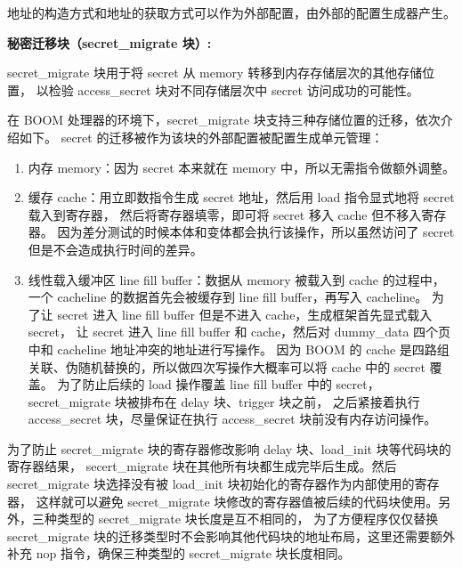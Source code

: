 地址的构造方式和地址的获取方式可以作为外部配置，由外部的配置生成器产生。\par

\textbf{秘密迁移块（secret\_migrate 块）:}\par
secret\_migrate 块用于将 secret 从 memory 转移到内存存储层次的其他存储位置，
以检验 access\_secret 块对不同存储层次中 secret 访问成功的可能性。\par

在 BOOM 处理器的环境下，secret\_migrate 块支持三种存储位置的迁移，依次介绍如下。
secret 的迁移被作为该块的外部配置被配置生成单元管理：
\begin{enumerate}
    \item 内存 memory：因为 secret 本来就在 memory 中，所以无需指令做额外调整。\par
    \item 缓存 cache：用立即数指令生成 secret 地址，然后用 load 指令显式地将 secret 载入到寄存器，
然后将寄存器填零，即可将 secret 移入 cache 但不移入寄存器。
因为差分测试的时候本体和变体都会执行该操作，所以虽然访问了 secret 但是不会造成执行时间的差异。\par
    \item 线性载入缓冲区 line fill buffer：数据从 memory 被载入到 cache 的过程中，
    一个 cacheline 的数据首先会被缓存到 line fill buffer，再写入 cacheline。
    为了让 secret 进入 line fill buffer 但是不进入 cache，生成框架首先显式载入 secret，
    让 secret 进入 line fill buffer 和 cache，然后对 dummy\_data 四个页中和 cacheline 地址冲突的地址进行写操作。
    因为 BOOM 的 cache 是四路组关联、伪随机替换的，所以做四次写操作大概率可以将 cache 中的 secret 覆盖。
    为了防止后续的 load 操作覆盖 line fill buffer 中的 secret，secret\_migrate 块被排布在 delay 块、trigger 块之前，
    之后紧接着执行 access\_secret 块，尽量保证在执行 access\_secret 块前没有内存访问操作。\par
\end{enumerate}

为了防止 secret\_migrate 块的寄存器修改影响 delay 块、load\_init 块等代码块的寄存器结果，
secert\_migrate 块在其他所有块都生成完毕后生成。然后 secret\_migrate 块选择没有被 load\_init 块初始化的寄存器作为内部使用的寄存器，
这样就可以避免 secret\_migrate 块修改的寄存器值被后续的代码块使用。另外，三种类型的 secret\_migrate 块长度是互不相同的，
为了方便程序仅仅替换 secret\_migrate 块的迁移类型时不会影响其他代码块的地址布局，这里还需要额外补充 nop 指令，确保三种类型的 secret\_migrate 块长度相同。\par

